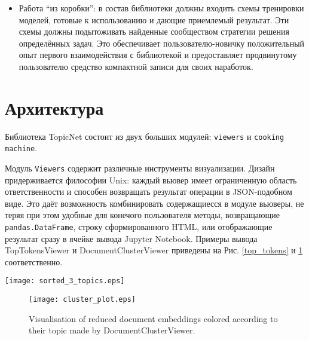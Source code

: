 \begin{itemize}
{Третье преимущество заключается в читаемости и портируемости. Работая с более сжатым и регулярным кодом, пользователь может видеть бОльший объём кода в рамках экрана, что улучшает понимание эксперимента. В результате становится легче обсуждать, изучать и отлаживать эксперименты, а также делиться ими.}

\item{Работа ``из коробки'': в состав библиотеки должны входить схемы тренировки моделей, готовые к использованию и дающие приемлемый результат. Эти схемы должны подытоживать найденные сообществом стратегии решения определённых задач. Это обеспечивает пользователю-новичку положительный опыт первого взаимодействия с библиотекой и предоставляет продвинутому пользователю средство компактной записи для своих наработок.}

\end{itemize}

\section{Архитектура}

Библиотека TopicNet состоит из двух больших модулей: \texttt{viewers} и \texttt{cooking machine}. 

Модуль \texttt{Viewers} содержит различные инструменты визуализации. Дизайн придерживается философии Unix: каждый вьювер имеет ограниченную область ответственности и способен возвращать результат операции в JSON-подобном виде. 
Это даёт возможность комбинировать содержащиесся в модуле вьюверы, не теряя при этом удобные для конечого пользователя методы, возвращающие \texttt{pandas.DataFrame}, строку сформированного HTML, или отображающие результат сразу в ячейке вывода Jupyter Notebook. Примеры вывода TopTokensViewer и DocumentClusterViewer приведены на Рис. \ref{top_tokens} и \ref{documents_clusters} соответственно.

\begin{figure*}[h]
    \centering
    \texttt{[image: sorted\_3\_topics.eps]}
    \caption{Output of the TopTokensViewer. Token score in the topic is calculated for every token, score function can be specified at the stage of a viewer initialization.}
\label{top_tokens}
\end{figure*}

\begin{figure}[h]
    \centering
    \texttt{[image: cluster\_plot.eps]}
    \caption{Visualisation of reduced document embeddings colored according to their topic made by DocumentClusterViewer.}
\label{documents_clusters}
\end{figure}

